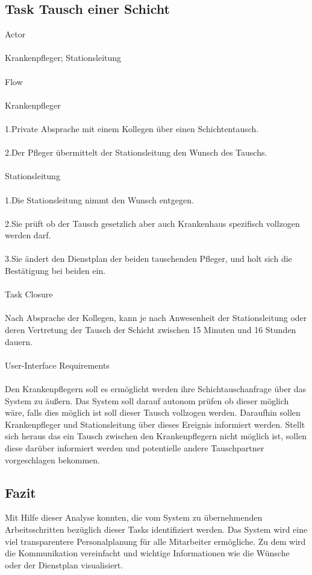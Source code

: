\documentclass[11pt,
paper=a4,
bibtotocnumbered,	  %
liststotocnumbered,  %
DIV=calc,		  %
tablecaptionabove,	  %
headinclude,
]{article}
\begin{document}
\subsection{Task Tausch einer Schicht}
Actor\\\\
Krankenpfleger; Stationsleitung \\\\
Flow \\\\
Krankenpfleger\\\\
1.Private Absprache mit einem Kollegen über einen Schichtentausch.\\\\
2.Der Pfleger übermittelt der Stationsleitung den Wunsch des Tauschs.\\\\
Stationsleitung\\\\
1.Die Stationsleitung nimmt den Wunsch entgegen.\\\\
2.Sie prüft ob der Tausch gesetzlich aber auch Krankenhaus spezifisch vollzogen werden darf.\\\\
3.Sie ändert den Dienstplan der beiden tauschenden Pfleger, und holt sich die Bestätigung bei beiden ein.\\\\
Task Closure\\\\
Nach Absprache der Kollegen, kann je nach Anwesenheit der Stationsleitung oder deren Vertretung der Tausch der Schicht zwischen 15 Minuten und 16 Stunden dauern.\\\\
User-Interface Requirements\\\\
Den Krankenpflegern soll es ermöglicht werden ihre Schichtauschanfrage über das System zu äußern. Das System soll darauf autonom prüfen ob dieser möglich wäre, falls dies möglich ist soll dieser Tausch vollzogen werden. Daraufhin sollen Krankenpfleger und Stationsleitung über dieses Ereignis informiert werden. Stellt sich heraus das ein Tausch zwischen den Krankenpflegern nicht möglich ist, sollen diese darüber informiert werden und potentielle andere Tauschpartner vorgeschlagen bekommen.
\subsection{Fazit}
Mit Hilfe dieser Analyse konnten, die vom System zu übernehmenden Arbeitsschritten bezüglich dieser Tasks identifiziert werden. Das System wird eine viel transparentere Personalplanung für alle Mitarbeiter ermögliche. Zu dem wird die Kommunikation vereinfacht und wichtige Informationen wie die Wünsche oder der Dienstplan visualisiert.
\end{document}
